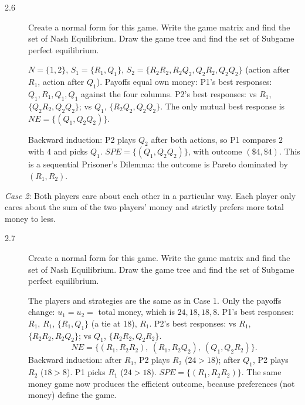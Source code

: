 \begin{description}
\item[2.6] Create a normal form for this game. Write the game matrix and find the set of Nash Equilibrium. Draw the game tree and find the set of Subgame perfect equilibrium.
\begin{solution}
$N=\{1,2\}$, $S_1=\{R_1,Q_1\}$, $S_2=\{R_2R_2,R_2Q_2,Q_2R_2,Q_2Q_2\}$ (action after $R_1$, action after $Q_1$). Payoffs equal own money:
P1's best responses: $Q_1, R_1, Q_1, Q_1$ against the four columns. P2's best responses: vs $R_1$, $\{Q_2R_2,Q_2Q_2\}$; vs $Q_1$, $\{R_2Q_2,Q_2Q_2\}$. The only mutual best response is $NE=\{(Q_1,Q_2Q_2)\}$.

Backward induction: P2 plays $Q_2$ after both actions, so P1 compares $2$ with $4$ and picks $Q_1$. $SPE=\{(Q_1,Q_2Q_2)\}$, with outcome $(\$4,\$4)$. This is a sequential Prisoner's Dilemma: the outcome is Pareto dominated by $(R_1,R_2)$.
\end{solution}
\end{description}

\emph{Case 2}: Both players care about each other in a particular way. Each player only cares about the sum of the two players' money and strictly prefers more total money to less.

\begin{description}
\item[2.7] Create a normal form for this game. Write the game matrix and find the set of Nash Equilibrium. Draw the game tree and find the set of Subgame perfect equilibrium.
\begin{solution}
The players and strategies are the same as in Case 1. Only the payoffs change: $u_1=u_2=$ total money, which is $24,18,18,8$.
P1's best responses: $R_1$, $R_1$, $\{R_1,Q_1\}$ (a tie at 18), $R_1$. P2's best responses: vs $R_1$, $\{R_2R_2,R_2Q_2\}$; vs $Q_1$, $\{R_2R_2,Q_2R_2\}$.
\[NE=\{(R_1,R_2R_2),\ (R_1,R_2Q_2),\ (Q_1,Q_2R_2)\}.\]
Backward induction: after $R_1$, P2 plays $R_2$ ($24>18$); after $Q_1$, P2 plays $R_2$ ($18>8$). P1 picks $R_1$ ($24>18$). $SPE=\{(R_1,R_2R_2)\}$. The same money game now produces the efficient outcome, because preferences (not money) define the game.
\end{solution}
\end{description}


